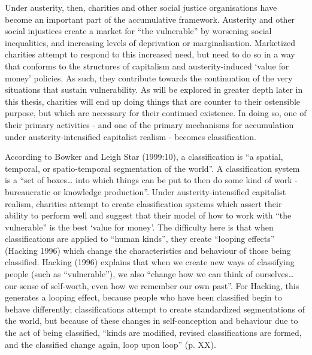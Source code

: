 Under austerity, then, charities and other social justice organisations
have become an important part of the accumulative framework. Austerity
and other social injustices create a market for ``the vulnerable'' by
worsening social inequalities, and increasing levels of deprivation or
marginalisation. Marketized charities attempt to respond to this
increased need, but need to do so in a way that conforms to the
structures of capitalism and austerity-induced `value for money'
policies. As such, they contribute towards the continuation of the very
situations that sustain vulnerability. As will be explored in greater
depth later in this thesis, charities will end up doing things that are
counter to their ostensible purpose, but which are necessary for their
continued existence. In doing so, one of their primary activities - and
one of the primary mechanisms for accumulation under
austerity-intensified capitalist realism - becomes classification.

According to Bowker and Leigh Star (1999:10), a classification is ``a
spatial, temporal, or spatio-temporal segmentation of the world''. A
classification system is a ``set of boxes\ldots{} into which things can
be put to then do some kind of work - bureaucratic or knowledge
production''. Under austerity-intensified capitalist realism, charities
attempt to create classification systems which assert their ability to
perform well and suggest that their model of how to work with ``the
vulnerable'' is the best `value for money'. The difficulty here is that
when classifications are applied to ``human kinds'', they create
``looping effects'' (Hacking 1996) which change the characteristics and
behaviour of those being classified. Hacking (1996) explains that when
we create new ways of classifying people (such as ``vulnerable''), we
also ``change how we can think of ourselves\ldots{} our sense of
self-worth, even how we remember our own past''. For Hacking, this
generates a looping effect, because people who have been classified
begin to behave differently; classifications attempt to create
standardized segmentations of the world, but because of these changes in
self-conception and behaviour due to the act of being classified,
``kinds are modified, revised classifications are formed, and the
classified change again, loop upon loop'' (p. XX).

